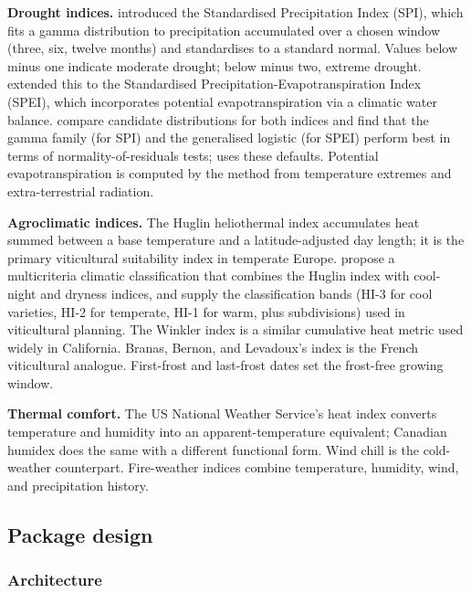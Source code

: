 \textbf{Drought indices.} \citet{mckee1993relationship} introduced the
Standardised Precipitation Index (SPI), which fits a gamma distribution
to precipitation accumulated over a chosen window (three, six, twelve
months) and standardises to a standard normal. Values below minus one
indicate moderate drought; below minus two, extreme drought.
\citet{vicente2010multiscalar} extended this to the Standardised
Precipitation-Evapotranspiration Index (SPEI), which incorporates
potential evapotranspiration via a climatic water balance.
\citet{stagge2015candidate} compare candidate distributions for both
indices and find that the gamma family (for SPI) and the generalised
logistic (for SPEI) perform best in terms of normality-of-residuals
tests;  uses these defaults. Potential
evapotranspiration is computed by the \citet{hargreaves1985reference}
method from temperature extremes and extra-terrestrial radiation.

\textbf{Agroclimatic indices.} The Huglin heliothermal index
\citep{huglin1978nouveau} accumulates heat summed between a base
temperature and a latitude-adjusted day length; it is the primary
viticultural suitability index in temperate Europe.
\citet{tonietto2004multicriteria} propose a multicriteria climatic
classification that combines the Huglin index with cool-night and
dryness indices, and supply the classification bands (HI-3 for cool
varieties, HI-2 for temperate, HI-1 for warm, plus subdivisions) used in
viticultural planning. The Winkler index \citep{winkler1974general} is a
similar cumulative heat metric used widely in California. Branas,
Bernon, and Levadoux's index is the French viticultural analogue.
First-frost and last-frost dates set the frost-free growing window.

\textbf{Thermal comfort.} The US National Weather Service's heat index
\citep{rothfusz1990heat} converts temperature and humidity into an
apparent-temperature equivalent; Canadian humidex
\citep{masterton1979humidex} does the same with a different functional
form. Wind chill \citep{osczevski2005new} is the cold-weather
counterpart. Fire-weather indices combine temperature, humidity, wind,
and precipitation history.

\subsection{Package design}\label{package-design}

\subsubsection{Architecture}\label{architecture}

